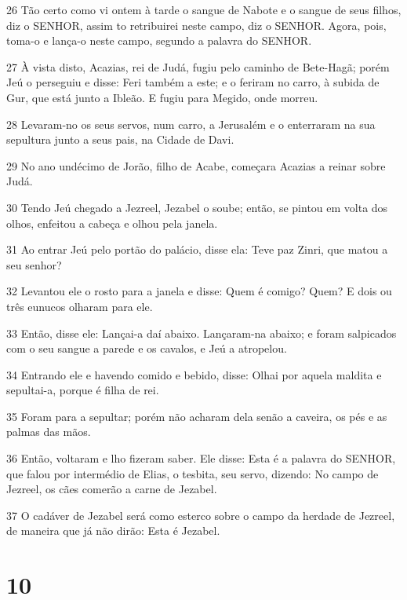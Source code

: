 \par 26 Tão certo como vi ontem à tarde o sangue de Nabote e o sangue de seus filhos, diz o SENHOR, assim to retribuirei neste campo, diz o SENHOR. Agora, pois, toma-o e lança-o neste campo, segundo a palavra do SENHOR.
\par 27 À vista disto, Acazias, rei de Judá, fugiu pelo caminho de Bete-Hagã; porém Jeú o perseguiu e disse: Feri também a este; e o feriram no carro, à subida de Gur, que está junto a Ibleão. E fugiu para Megido, onde morreu.
\par 28 Levaram-no os seus servos, num carro, a Jerusalém e o enterraram na sua sepultura junto a seus pais, na Cidade de Davi.
\par 29 No ano undécimo de Jorão, filho de Acabe, começara Acazias a reinar sobre Judá.
\par 30 Tendo Jeú chegado a Jezreel, Jezabel o soube; então, se pintou em volta dos olhos, enfeitou a cabeça e olhou pela janela.
\par 31 Ao entrar Jeú pelo portão do palácio, disse ela: Teve paz Zinri, que matou a seu senhor?
\par 32 Levantou ele o rosto para a janela e disse: Quem é comigo? Quem? E dois ou três eunucos olharam para ele.
\par 33 Então, disse ele: Lançai-a daí abaixo. Lançaram-na abaixo; e foram salpicados com o seu sangue a parede e os cavalos, e Jeú a atropelou.
\par 34 Entrando ele e havendo comido e bebido, disse: Olhai por aquela maldita e sepultai-a, porque é filha de rei.
\par 35 Foram para a sepultar; porém não acharam dela senão a caveira, os pés e as palmas das mãos.
\par 36 Então, voltaram e lho fizeram saber. Ele disse: Esta é a palavra do SENHOR, que falou por intermédio de Elias, o tesbita, seu servo, dizendo: No campo de Jezreel, os cães comerão a carne de Jezabel.
\par 37 O cadáver de Jezabel será como esterco sobre o campo da herdade de Jezreel, de maneira que já não dirão: Esta é Jezabel.

\chapter{10}

